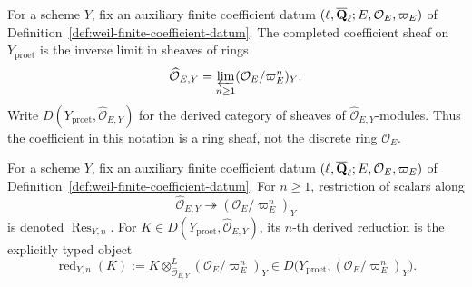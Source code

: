 
\begin{definition}
\label{def:completed-integral-coefficient-sheaf}


For a scheme \(Y\), fix an auxiliary finite coefficient datum
\((\ell,\overline{\mathbf Q}_\ell;E,\mathcal O_E,\varpi_E)\) of
Definition~\ref{def:weil-finite-coefficient-datum}.
The completed coefficient sheaf on \(Y_{\mathrm{proet}}\) is the inverse
limit in sheaves of rings
\[
 \widehat{\mathcal O}_{E,Y}
 =\varprojlim_{n\geq1}(\mathcal O_E/\varpi_E^n)_Y.
\]
Write
\(D(Y_{\mathrm{proet}},\widehat{\mathcal O}_{E,Y})\) for the derived
category of sheaves of \(\widehat{\mathcal O}_{E,Y}\)-modules.  Thus the
coefficient in this notation is a ring sheaf, not the discrete ring
\(\mathcal O_E\).
\end{definition}


\begin{definition}
\label{def:finite-reduction}


For a scheme \(Y\), fix an auxiliary finite coefficient datum
\((\ell,\overline{\mathbf Q}_\ell;E,\mathcal O_E,\varpi_E)\) of
Definition~\ref{def:weil-finite-coefficient-datum}.
For \(n\geq1\), restriction of scalars along
\[
 \widehat{\mathcal O}_{E,Y}\twoheadrightarrow
 (\mathcal O_E/\varpi_E^n)_Y
\]
is denoted \(\operatorname{Res}_{Y,n}\).  For
\(K\in D(Y_{\mathrm{proet}},\widehat{\mathcal O}_{E,Y})\), its
\(n\)-th derived reduction is the explicitly typed object
\[
 \operatorname{red}_{Y,n}(K):=
 K\otimes^L_{\widehat{\mathcal O}_{E,Y}}
 (\mathcal O_E/\varpi_E^n)_Y
 \in D\bigl(Y_{\mathrm{proet}},(\mathcal O_E/\varpi_E^n)_Y\bigr).
\]
\end{definition}


